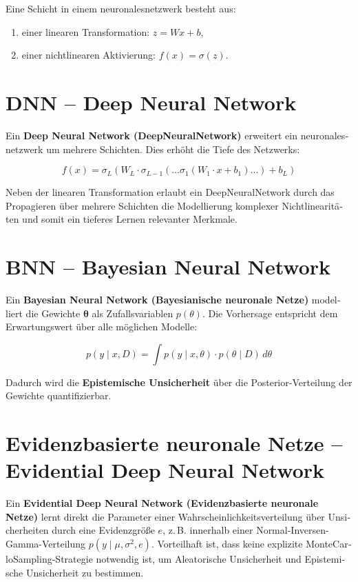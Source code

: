 \begin{otherlanguage}{ngerman}
Eine Schicht in einem \gls{neuronalesnetzwerk} besteht aus:
\begin{enumerate}
  \item einer linearen Transformation: \( z = Wx + b \),
  \item einer nichtlinearen Aktivierung: \( f(x) = \sigma(z) \).
\end{enumerate}


\section*{DNN – Deep Neural Network}

Ein \textbf{Deep Neural Network (\gls{DeepNeuralNetwork})} erweitert ein \gls{neuronalesnetzwerk} um mehrere Schichten. Dies erhöht die Tiefe des Netzwerks:

\[
f(x) = \sigma_L\left(W_L \cdot \sigma_{L-1}\left(\ldots \sigma_1\left(W_1 \cdot x + b_1\right) \ldots \right) + b_L\right)
\]

Neben der linearen Transformation erlaubt ein \gls{DeepNeuralNetwork} durch das Propagieren über mehrere Schichten die Modellierung komplexer Nichtlinearitäten und somit ein tieferes Lernen relevanter Merkmale.

\section*{BNN – Bayesian Neural Network}

Ein \textbf{Bayesian Neural Network (\gls{Bayesianische neuronale Netze})} modelliert die Gewichte $\boldsymbol{\theta}$ als Zufallsvariablen $p(\theta)$. Die Vorhersage entspricht dem Erwartungswert über alle möglichen Modelle:

\[
p(y \mid x, D) = \int p(y \mid x, \theta) \cdot p(\theta \mid D) \, d\theta
\]

Dadurch wird die \textbf{\gls{Epistemische Unsicherheit}} über die Posterior-Verteilung der Gewichte quantifizierbar.

\section*{\gls{Evidenzbasierte neuronale Netze} – Evidential Deep Neural Network}

Ein \textbf{Evidential Deep Neural Network (\gls{Evidenzbasierte neuronale Netze})} lernt direkt die Parameter einer Wahrscheinlichkeitsverteilung über Unsicherheiten durch eine Evidenzgröße $e$, z.\,B. innerhalb einer Normal-Inversen-Gamma-Verteilung $p(y \mid \mu, \sigma^2, e)$. Vorteilhaft ist, dass keine explizite \gls{MonteCarloSampling}-Strategie notwendig ist, um \gls{Aleatorische Unsicherheit} und \gls{Epistemische Unsicherheit} zu bestimmen.


\end{otherlanguage}
